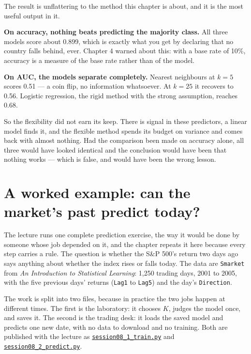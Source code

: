 \documentclass[
  letterpaper,
  10pt,
  twoside,
  openright,
  numbers=noenddot,
  chapterprefix=true]{scrbook}
\begin{document}
The result is unflattering to the method this chapter is about, and it
is the most useful output in it.

\textbf{On accuracy, nothing beats predicting the majority class.} All
three models score about 0.899, which is exactly what you get by
declaring that no country falls behind, ever. Chapter 4 warned about
this: with a base rate of 10\%, accuracy is a measure of the base rate
rather than of the model.

\textbf{On AUC, the models separate completely.} Nearest neighbours at
\(k=5\) scores 0.51 --- a coin flip, no information whatsoever. At
\(k=25\) it recovers to 0.56. Logistic regression, the rigid method with
the strong assumption, reaches 0.68.

So the flexibility did not earn its keep. There is signal in these
predictors, a linear model finds it, and the flexible method spends its
budget on variance and comes back with almost nothing. Had the
comparison been made on accuracy alone, all three would have looked
identical and the conclusion would have been that nothing works ---
which is false, and would have been the wrong lesson.

\section{A worked example: can the market's past predict
today?}\label{a-worked-example-can-the-markets-past-predict-today}

The lecture runs one complete prediction exercise, the way it would be
done by someone whose job depended on it, and the chapter repeats it
here because every step carries a rule. The question is whether the S\&P
500's return two days ago says anything about whether the index rises or
falls today. The data are \texttt{Smarket} from \emph{An Introduction to
Statistical Learning}: 1,250 trading days, 2001 to 2005, with the five
previous days' returns (\texttt{Lag1} to \texttt{Lag5}) and the day's
\texttt{Direction}.

The work is split into two files, because in practice the two jobs
happen at different times. The first is the laboratory: it chooses
\(K\), judges the model once, and saves it. The second is the trading
desk: it loads the saved model and predicts one new date, with no data
to download and no training. Both are published with the lecture as
\href{https://warint.github.io/quantitative-methods/session-08/session08_1_train.py}{\texttt{session08\_1\_train.py}}
and
\href{https://warint.github.io/quantitative-methods/session-08/session08_2_predict.py}{\texttt{session08\_2\_predict.py}}.
\end{document}
